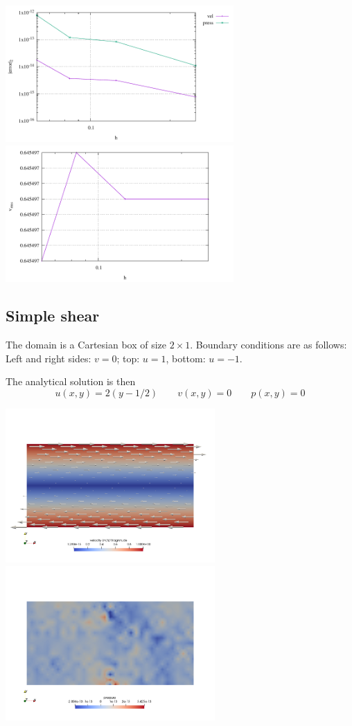 \documentclass[a4paper]{article}
\begin{document}
\begin{center}
\includegraphics[width=8.7cm]{./results/benchmark_pure_shear/convergence.pdf}
\includegraphics[width=8.7cm]{./results/benchmark_pure_shear/vrms.pdf}
\end{center}


\subsection{Simple shear}

The domain is a Cartesian box of size $2\times 1$.
Boundary conditions are as follows:
Left and right sides: $v=0$; top: $u=1$, bottom: $u=-1$.

The analytical solution is then
\[
u(x,y)=2(y-1/2)
\qquad
v(x,y)=0
\qquad
p(x,y)=0
\]

\begin{center}
\includegraphics[width=8cm]{./results/benchmark_simple_shear/vel}
\includegraphics[width=8cm]{./results/benchmark_simple_shear/press}
\end{center}
\end{document}
